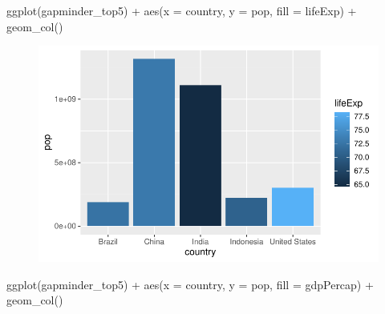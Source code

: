 \documentclass[
  letterpaper,
  DIV=11,
  numbers=noendperiod]{scrartcl}
\newenvironment{Shaded}{\begin{snugshade}}{\end{snugshade}}
\newcommand{\AttributeTok}[1]{\textcolor[rgb]{0.40,0.45,0.13}{#1}}
\newcommand{\FunctionTok}[1]{\textcolor[rgb]{0.28,0.35,0.67}{#1}}
\newcommand{\NormalTok}[1]{\textcolor[rgb]{0.00,0.23,0.31}{#1}}
\newcommand{\SpecialCharTok}[1]{\textcolor[rgb]{0.37,0.37,0.37}{#1}}
\begin{document}
\begin{Shaded}
\begin{Highlighting}[]
\FunctionTok{ggplot}\NormalTok{(gapminder\_top5) }\SpecialCharTok{+} 
  \FunctionTok{aes}\NormalTok{(}\AttributeTok{x =}\NormalTok{ country, }\AttributeTok{y =}\NormalTok{ pop, }\AttributeTok{fill =}\NormalTok{ lifeExp) }\SpecialCharTok{+}
  \FunctionTok{geom\_col}\NormalTok{()}
\end{Highlighting}
\end{Shaded}

\begin{figure}[H]

{\centering \includegraphics{class05_files/figure-pdf/unnamed-chunk-5-3.pdf}

}

\end{figure}

\begin{Shaded}
\begin{Highlighting}[]
\FunctionTok{ggplot}\NormalTok{(gapminder\_top5) }\SpecialCharTok{+}
  \FunctionTok{aes}\NormalTok{(}\AttributeTok{x =}\NormalTok{ country, }\AttributeTok{y =}\NormalTok{ pop, }\AttributeTok{fill =}\NormalTok{ gdpPercap) }\SpecialCharTok{+}
  \FunctionTok{geom\_col}\NormalTok{()}
\end{Highlighting}
\end{Shaded}
\end{document}
